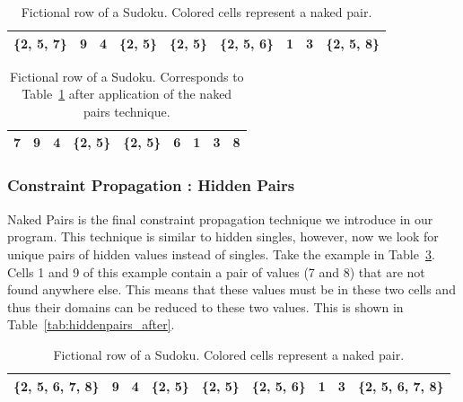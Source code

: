 \documentclass[11pt]{article} %
\begin{document}
\begin{table}[htbp]
    \caption{Fictional row of a Sudoku. Colored cells represent a naked pair.}
    \label{tab:nakedpairs}
    \begin{center}
        \begin{tabular}{|c|c|c|c|c|c|c|c|c|}
        \hline
        \{2, 5, 7\} & 9 & 4 & \cellcolor[gray]{0.7}\{2, 5\} & \cellcolor[gray]{0.7}\{2, 5\} & \{2, 5, 6\} & 1 & 3 & \{2, 5, 8\}\\
        \hline
        \end{tabular}
    \end{center}
\end{table}

\begin{table}[htbp]
    \caption{Fictional row of a Sudoku. Corresponds to Table~\ref{tab:nakedpairs} after application of the naked pairs technique.}
    \label{tab:nakedpairs_after}
    \begin{center}
        \begin{tabular}{|c|c|c|c|c|c|c|c|c|}
        \hline
        \cellcolor[gray]{0.7}7 & 9 & 4 & \{2, 5\} & \{2, 5\} & \cellcolor[gray]{0.7} 6 & 1 & 3 & \cellcolor[gray]{0.7} 8\\
        \hline
        \end{tabular}
    \end{center}
\end{table}

\subsubsection{Constraint Propagation : Hidden Pairs}
\label{sec:hpairs}
Naked Pairs is the final constraint propagation technique we introduce in our program. This technique is similar to hidden singles, however, now we look for unique pairs of hidden values instead of singles.
Take the example in Table~\ref{tab:hiddenpairs}. Cells 1 and 9 of this example contain a pair of values (7 and 8) that are not found anywhere else. This means that these values must be in these two cells and thus their domains can be reduced to these two values. This is shown in Table~\ref{tab:hiddenpairs_after}.

\begin{table}[htbp]
    \caption{Fictional row of a Sudoku. Colored cells represent a naked pair.}
    \label{tab:hiddenpairs}
    \begin{center}
        \begin{tabular}{|c|c|c|c|c|c|c|c|c|}
        \hline
        \cellcolor[gray]{0.7}\{2, 5, 6, 7, 8\} & 9 & 4 & \{2, 5\} & \{2, 5\} & \{2, 5, 6\} & 1 & 3 & \cellcolor[gray]{0.7}\{2, 5, 6, 7, 8\}\\
        \hline
        \end{tabular}
    \end{center}
\end{table}
\end{document}

